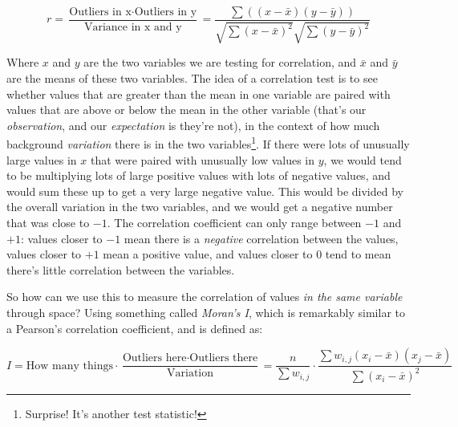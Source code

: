\begin{equation}
  r = \frac{\text{Outliers in x} \cdot \text{Outliers in y}}{\text{Variance in x and y}} = \frac{\sum((x - \bar{x})(y-\bar{y}))}{\sqrt{\sum(x-\bar{x})^2}\sqrt{\sum(y-\bar{y})^2}}
  \label{pearson-equ}
\end{equation}

Where $x$ and $y$ are the two variables we are testing for
correlation, and $\bar{x}$ and $\bar{y}$ are the means of these two
variables. The idea of a correlation test is to see whether values
that are greater than the mean in one variable are paired with values
that are above or below the mean in the other variable (that's our
\emph{observation}, and our \emph{expectation} is they're not), in the
context of how much background \emph{variation} there is in the two
variables\footnote{Surprise! It's another test statistic!}. If there
were lots of unusually large values in $x$ that were paired with
unusually low values in $y$, we would tend to be multiplying lots of
large positive values with lots of negative values, and would sum
these up to get a very large negative value. This would be divided by
the overall variation in the two variables, and we would get a
negative number that was close to $-1$. The correlation coefficient
can only range between $-1$ and $+1$: values closer to $-1$ mean there
is a \emph{negative} correlation between the values, values closer to
$+1$ mean a positive value, and values closer to $0$ tend to mean
there's little correlation between the variables.

So how can we use this to measure the correlation of values \emph{in
  the same variable} through space? Using something called
\emph{Moran's I}, which is remarkably similar to a Pearson's
correlation coefficient, and is defined as:

\begin{equation}
  I = \text{How many things} \cdot \frac{\text{Outliers here} \cdot \text{Outliers there}}{\text{Variation}} = \frac{n}{\sum w_{i,j}} \cdot \frac{\sum w_{i,j}(x_i-\bar{x})(x_j-\bar{x})}{\sum(x_i-\bar{x})^2}
\end{equation}

